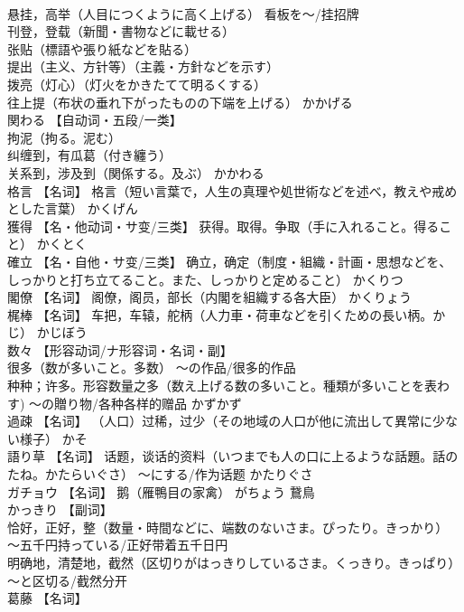 \documentclass[8pt]{extreport}
\begin{document}
\begin{CJK}{UTF8}{min}
\\	悬挂，高举（人目につくように高く上げる） 看板を～/挂招牌 
\\	刊登，登载（新聞・書物などに載せる） 
\\	张贴（標語や張り紙などを貼る） 
\\	提出（主义、方针等）（主義・方針などを示す） 
\\	拨亮（灯心）（灯火をかきたてて明るくする） 
\\	往上提（布状の垂れ下がったものの下端を上げる）	かかげる	
\\	関わる	【自动词・五段/一类】 
\\	拘泥（拘る。泥む） 
\\	纠缠到，有瓜葛（付き纏う） 
\\	关系到，涉及到（関係する。及ぶ）	かかわる	
\\	格言	【名词】 格言（短い言葉で，人生の真理や処世術などを述べ，教えや戒めとした言葉）	かくげん	
\\	獲得	【名・他动词・サ变/三类】 获得。取得。争取（手に入れること。得ること）	かくとく	
\\	確立	【名・自他・サ变/三类】 确立，确定（制度・組織・計画・思想などを、しっかりと打ち立てること。また、しっかりと定めること）	かくりつ	
\\	閣僚	【名词】 阁僚，阁员，部长（内閣を組織する各大臣）	かくりょう	
\\	梶棒	【名词】 车把，车辕，舵柄（人力車・荷車などを引くための長い柄。かじ）	かじぼう	
\\	数々	【形容动词/ナ形容词・名词・副】 
\\	很多（数が多いこと。多数） ～の作品/很多的作品 
\\	种种；许多。形容数量之多（数え上げる数の多いこと。種類が多いことを表わす) ～の贈り物/各种各样的赠品	かずかず	
\\	過疎	【名词】 （人口）过稀，过少（その地域の人口が他に流出して異常に少ない様子）	かそ	
\\	語り草	【名词】 话题，谈话的资料（いつまでも人の口に上るような話題。話のたね。かたらいぐさ） ～にする/作为话题	かたりぐさ	
\\	ガチョウ	【名词】 鹅（雁鴨目の家禽）	がちょう	鵞鳥
\\	かっきり	【副词】 
\\	恰好，正好，整（数量・時間などに、端数のないさま。ぴったり。きっかり） ～五千円持っている/正好带着五千日円 
\\	明确地，清楚地，截然（区切りがはっきりしているさま。くっきり。きっぱり） ～と区切る/截然分开		
\\	葛藤	【名词】 

\end{CJK}
\end{document}
